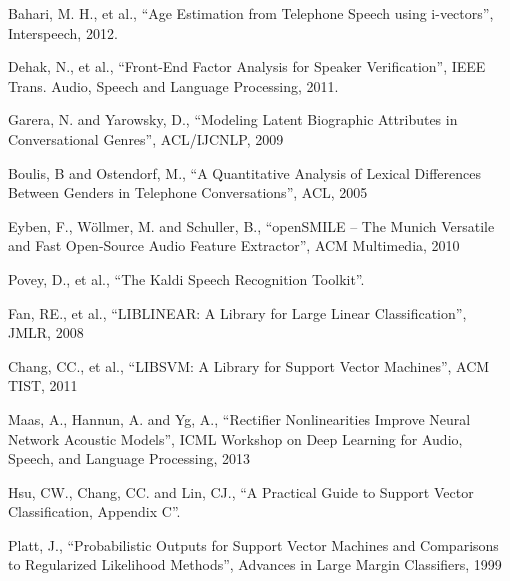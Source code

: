 \documentclass[a4paper]{article}
\begin{document}
\eightpt

\begin{thebibliography}{10}
 Bahari, M. H., et al., 
``Age Estimation from Telephone Speech using i-vectors'', 
Interspeech, 2012.

 Dehak, N., et al., 
``Front-End Factor Analysis for Speaker Verification'', 
IEEE Trans. Audio, Speech and Language Processing, 2011.

 Garera, N. and Yarowsky, D.,
``Modeling Latent Biographic Attributes in Conversational Genres'',
ACL/IJCNLP, 2009

 Boulis, B and Ostendorf, M.,
``A Quantitative Analysis of Lexical Differences Between Genders in Telephone Conversations'',
ACL, 2005

 Eyben, F., Wöllmer, M. and Schuller, B.,
``openSMILE – The Munich Versatile and Fast Open-Source Audio Feature Extractor'',
ACM Multimedia, 2010

 Povey, D., et al.,
``The Kaldi Speech Recognition Toolkit''.

 Fan, RE., et al.,
``LIBLINEAR: A Library for Large Linear Classification'',
JMLR, 2008

 Chang, CC., et al.,
``LIBSVM: A Library for Support Vector Machines'',
ACM TIST, 2011

 Maas, A.,  Hannun, A. and Yg, A.,
``Rectifier Nonlinearities Improve Neural Network Acoustic Models'',
ICML Workshop on Deep Learning for Audio, Speech, and Language Processing, 2013

 Hsu, CW., Chang, CC. and Lin, CJ., 
``A Practical Guide to Support Vector Classification, Appendix C''.

 Platt, J.,
``Probabilistic Outputs for Support Vector Machines and Comparisons to Regularized Likelihood Methods'',
Advances in Large Margin Classifiers, 1999

\end{thebibliography}
\end{document}
